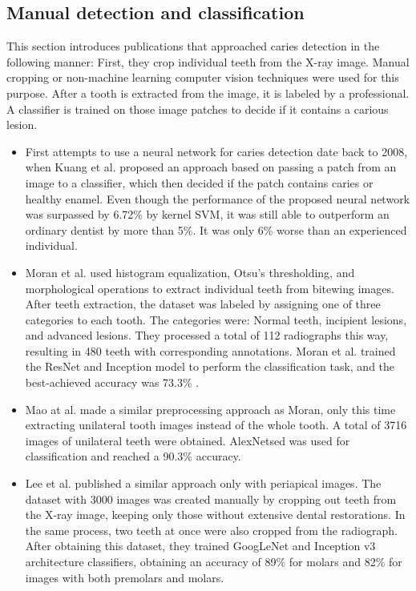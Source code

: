 \subsection{Manual detection and classification}
This section introduces publications that approached caries detection in the following manner: First, they crop individual teeth from the X-ray image. Manual cropping or non-machine learning computer vision techniques were used for this purpose. After a tooth is extracted from the image, it is labeled by a professional. A classifier is trained on those image patches to decide if it contains a carious lesion.
\begin{itemize}
    \item First attempts to use a neural network for caries detection date back to 2008, when Kuang et al. \cite{Kuang2008} proposed an approach based on passing a patch from an image to a classifier, which then decided if the patch contains caries or healthy enamel. Even though the performance of the proposed neural network was surpassed by 6.72\% by kernel SVM, it was still able to outperform an ordinary dentist by more than 5\%. It was only 6\% worse than an experienced individual.
    \item Moran et al.\cite{Moran2021} used histogram equalization, Otsu's thresholding, and morphological operations to extract individual teeth from bitewing images. After teeth extraction, the dataset was labeled by assigning one of three categories to each tooth. The categories were: Normal teeth, incipient lesions, and advanced lesions. They processed a total of 112 radiographs  this way, resulting in 480 teeth with corresponding annotations. Moran et al. trained the ResNet and Inception model to perform the classification task, and the best-achieved accuracy was 73.3\% \cite{Moran2021}.
    \item{Mao at al. \cite{Mao2021}} made a similar preprocessing approach as Moran, only this time extracting unilateral tooth images instead of the whole tooth. A total of 3716 images of unilateral teeth were obtained. AlexNetsed was used for classification and reached a 90.3\% accuracy.
    \item{Lee et al. \cite{Lee2018}} published a similar approach only with periapical images. The dataset with 3000 images was created manually by cropping out teeth from the X-ray image, keeping only those without extensive dental restorations. In the same process, two teeth at once were also cropped from the radiograph. After obtaining this dataset, they trained GoogLeNet and Inception v3 architecture classifiers, obtaining an accuracy of 89\%  for molars and 82\% for images with both premolars and molars.
\end{itemize}


